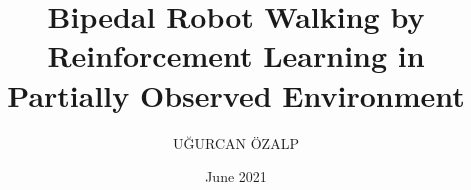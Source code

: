 \documentclass[chaparabic,sc,ms,12pt,oneandhalf]{metu_iam}
\author{UĞURCAN ÖZALP}
\title{Bipedal Robot Walking by Reinforcement Learning in Partially Observed Environment}
\date{June 2021} %
\theoremstyle{definition}
\begin{document}
\begin{preliminaries}
\end{preliminaries}
%   
% 



























%
%
\appendix
%
%
%
%
%
\end{document}
